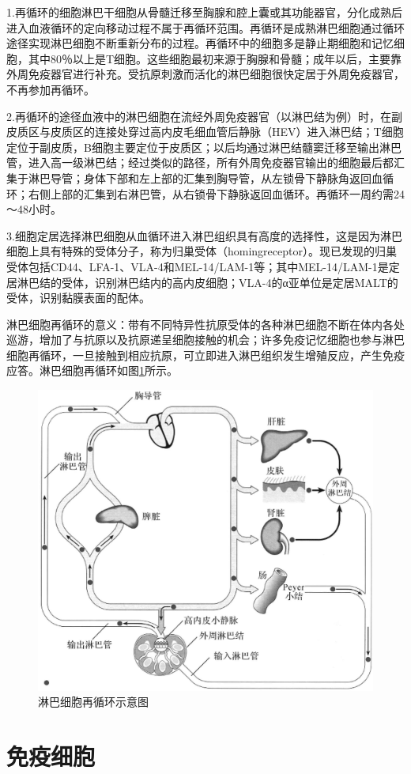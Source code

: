 1.再循环的细胞淋巴干细胞从骨髓迁移至胸腺和腔上囊或其功能器官，分化成熟后进入血液循环的定向移动过程不属于再循环范围。再循环是成熟淋巴细胞通过循环途径实现淋巴细胞不断重新分布的过程。再循环中的细胞多是静止期细胞和记忆细胞，其中80％以上是T细胞。这些细胞最初来源于胸腺和骨髓；成年以后，主要靠外周免疫器官进行补充。受抗原刺激而活化的淋巴细胞很快定居于外周免疫器官，不再参加再循环。

2.再循环的途径血液中的淋巴细胞在流经外周免疫器官（以淋巴结为例）时，在副皮质区与皮质区的连接处穿过高内皮毛细血管后静脉（HEV）进入淋巴结；T细胞定位于副皮质，B细胞主要定位于皮质区；以后均通过淋巴结髓窦迁移至输出淋巴管，进入高一级淋巴结；经过类似的路径，所有外周免疫器官输出的细胞最后都汇集于淋巴导管；身体下部和左上部的汇集到胸导管，从左锁骨下静脉角返回血循环；右侧上部的汇集到右淋巴管，从右锁骨下静脉返回血循环。再循环一周约需24～48小时。

3.细胞定居选择淋巴细胞从血循环进入淋巴组织具有高度的选择性，这是因为淋巴细胞上具有特殊的受体分子，称为归巢受体（homingreceptor）。现已发现的归巢受体包括CD44、LFA-1、VLA-4和MEL-14/LAM-1等；其中MEL-14/LAM-1是定居淋巴结的受体，识别淋巴结内的高内皮细胞；VLA-4的α亚单位是定居MALT的受体，识别黏膜表面的配体。

淋巴细胞再循环的意义：带有不同特异性抗原受体的各种淋巴细胞不断在体内各处巡游，增加了与抗原以及抗原递呈细胞接触的机会；许多免疫记忆细胞也参与淋巴细胞再循环，一旦接触到相应抗原，可立即进入淋巴组织发生增殖反应，产生免疫应答。淋巴细胞再循环如图\ref{fig2-12}所示。

\begin{figure}[!htbp]
 \centering
 \includegraphics[width=.6\textwidth]{./images/Image00037.jpg}
 \caption{淋巴细胞再循环示意图}
 \label{fig2-12}
  \end{figure} 

\section{免疫细胞}

